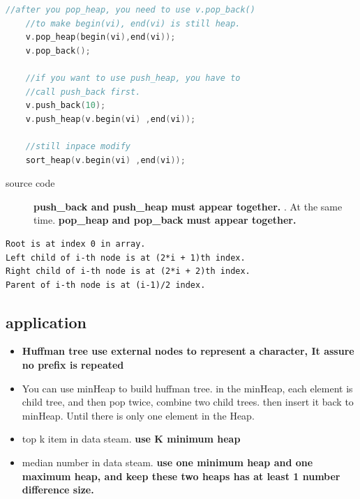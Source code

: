 \documentclass[a4paper,11pt,twoside]{book}
\begin{document}
\begin{itemize}
\begin{lstlisting}[frame=single, language=c++, mathescape=true]
	//after you pop_heap, you need to use v.pop_back()
	//to make begin(vi), end(vi) is still heap. 
	v.pop_heap(begin(vi),end(vi));
	v.pop_back();
	
	//if you want to use push_heap, you have to 
	//call push_back first. 
	v.push_back(10);
	v.push_heap(v.begin(vi) ,end(vi));
	
	//still inpace modify
	sort_heap(v.begin(vi) ,end(vi));
\end{lstlisting}
\begin{description}
	\item[source code] \textbf{push\_back and push\_heap must appear together. }. At the same time. \textbf{pop\_heap and pop\_back must appear together. }
\end{description}

\begin{lstlisting}
Root is at index 0 in array.
Left child of i-th node is at (2*i + 1)th index.
Right child of i-th node is at (2*i + 2)th index.
Parent of i-th node is at (i-1)/2 index.
\end{lstlisting}

\end{itemize}

\subsection{application}
\begin{itemize}
\item \textbf{Huffman tree use external nodes to represent a character, It assure no prefix is repeated }
\item You can use minHeap to build huffman tree. in the minHeap, each element is child tree, and then pop twice, combine two child trees. then insert it back to minHeap. Until there is only one element in the Heap. 

\item top k item in data steam. \textbf{use K minimum heap} 

\item median number in data steam. \textbf{use one minimum heap and one maximum heap, and keep these two heaps has at least 1 number difference size.} 
\end{itemize}
\end{document}
